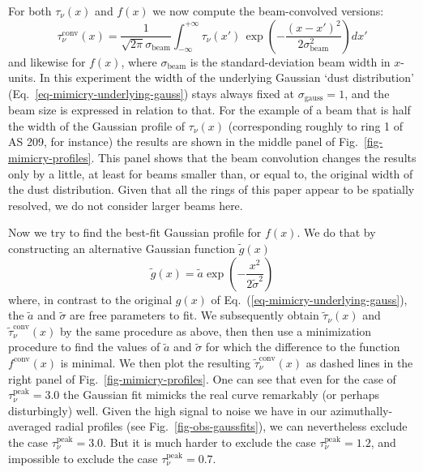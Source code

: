 \documentclass{aa}
\begin{document}
For both $\tau_\nu(x)$ and $f(x)$ we now compute the beam-convolved versions:
\begin{equation}
  \tau_\nu^{\mathrm{conv}}(x) = \frac{1}{\sqrt{2\pi}\sigma_{\mathrm{beam}}}\int_{-\infty}^{+\infty}
  \tau_\nu(x')\,\exp\left(-\frac{(x-x')^2}{2\sigma_{\mathrm{beam}}^2}\right)dx'
\end{equation}
and likewise for $f(x)$, where $\sigma_{\mathrm{beam}}$ is the
standard-deviation beam width in $x$-units. In this experiment the width of the
underlying Gaussian `dust distribution' (Eq.~\ref{eq-mimicry-underlying-gauss})
stays always fixed at $\sigma_{\mathrm{gauss}}=1$, and the beam size is
expressed in relation to that. For the example of a beam that is half the width
of the Gaussian profile of $\tau_\nu(x)$ (corresponding roughly to ring 1 of AS
209, for instance) the results are shown in the middle panel of
Fig.~\ref{fig-mimicry-profiles}. This panel shows that the beam convolution
changes the results only by a little, at least for beams smaller than, or equal
to, the original width of the dust distribution. Given that all the rings of
this paper appear to be spatially resolved, we do not consider larger beams
here.

Now we try to find the best-fit Gaussian profile for $f(x)$. We do that by
constructing an alternative Gaussian function $\tilde g(x)$
\begin{equation}\label{eq-mimicry-mimicked-gauss}
\tilde g(x) = \tilde a\exp\left(-\frac{x^2}{2\tilde\sigma^2}\right)
\end{equation}
where, in contrast to the original $g(x)$ of
Eq.~(\ref{eq-mimicry-underlying-gauss}), the $\tilde a$ and $\tilde\sigma$ are
free parameters to fit. We subsequently obtain $\tilde \tau_\nu(x)$ and $\tilde
\tau_\nu^{\mathrm{conv}}(x)$ by the same procedure as above, then then use a
minimization procedure to find the values of $\tilde a$ and $\tilde \sigma$ for
which the difference to the function $f^{\mathrm{conv}}(x)$ is minimal.  We then
plot the resulting $\tilde \tau_\nu^{\mathrm{conv}}(x)$ as dashed lines in the
right panel of Fig.~\ref{fig-mimicry-profiles}. One can see that even for the
case of $\tau_\nu^{\mathrm{peak}}=3.0$ the Gaussian fit mimicks the real curve
remarkably (or perhaps disturbingly) well. Given the high signal to noise we
have in our azimuthally-averaged radial profiles (see
Fig.~\ref{fig-obs-gaussfits}), we can nevertheless exclude the case
$\tau_\nu^{\mathrm{peak}}=3.0$. But it is much harder to exclude the case
$\tau_\nu^{\mathrm{peak}}=1.2$, and impossible to exclude the case
$\tau_\nu^{\mathrm{peak}}=0.7$.
\end{document}
